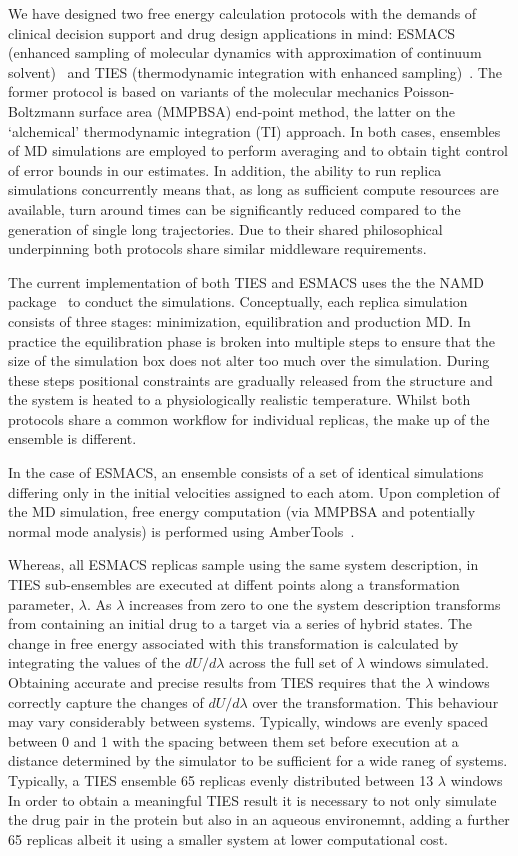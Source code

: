 We have designed two free energy calculation protocols with the demands of clinical
decision support and drug design applications in mind: ESMACS (enhanced
sampling of molecular dynamics with approximation of continuum
solvent)~\cite{Wan2017brd4} and TIES (thermodynamic integration with enhanced
sampling)~\cite{Bhati2017}. 
The former protocol is based on variants of the molecular mechanics Poisson-Boltzmann 
surface area (MMPBSA) end-point method, the latter on the `alchemical' thermodynamic 
integration (TI) approach. 
In both cases, ensembles of MD simulations are employed to perform averaging and
to obtain tight control of error bounds in our estimates. 
In addition, the ability to run replica simulations concurrently means that, as long as
sufficient compute resources are available, turn around times can be significantly 
reduced compared to the generation of single long trajectories.
Due to their shared philosophical underpinning both protocols share similar middleware 
requirements.

The current implementation of both TIES and ESMACS uses the the NAMD package~\cite{Phillips2005}
to conduct the simulations.
Conceptually, each replica simulation consists of three stages: minimization, equilibration 
and production MD.
In practice the equilibration phase is broken into multiple steps to ensure that the size of the 
simulation box does not alter too much over the simulation.
During these steps positional constraints are gradually released from the structure and the 
system is heated to a physiologically realistic temperature.
Whilst both protocols share a common workflow for individual replicas, the make up of the 
ensemble is different.

In the case of ESMACS, an ensemble consists of a set of identical simulations differing only in
the initial velocities assigned to each atom.
Upon completion of the MD simulation, free energy computation (via MMPBSA and potentially normal 
mode analysis) is performed using AmberTools~\cite{amber14, Case2005, MillerIII2012}.

Whereas, all ESMACS replicas sample using the same system description, in TIES sub-ensembles are executed 
at diffent points along a transformation parameter, $\lambda$.
As $\lambda$ increases from zero to one the system description transforms from containing an 
initial drug to a target via a series of hybrid states.
The change in free energy associated with this transformation is calculated by integrating the 
values of the $dU/d\lambda$ across the full set of $\lambda$ windows simulated.
Obtaining accurate and precise results from TIES requires that the $\lambda$ windows correctly 
capture the changes of $dU/d\lambda$ over the transformation.
This behaviour may vary considerably between systems.
Typically, windows are evenly spaced between 0 and 1 with the spacing between them set before 
execution at a distance determined by the simulator to be sufficient for a wide raneg of systems. 
Typically, a TIES ensemble 65 replicas evenly distributed between 13 $\lambda$ windows
In order to obtain a meaningful TIES result it is necessary to not only simulate the drug pair 
in the protein but also in an aqueous environemnt, adding a further 65 replicas albeit it using a
smaller system at lower computational cost.

